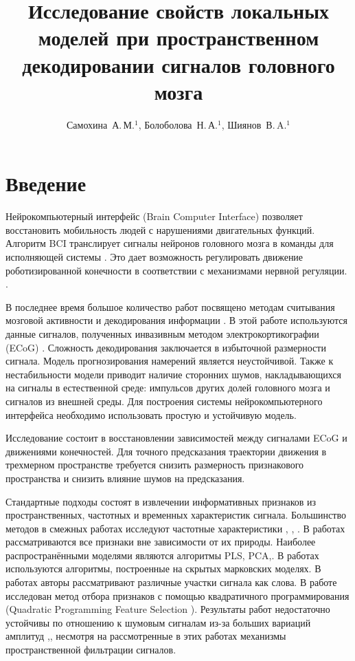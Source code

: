 \documentclass[12pt,twoside]{article}
\title
    [Локальные модели для декодирования сигналов] 
    {Исследование свойств локальных моделей при пространственном декодировании сигналов головного мозга}
\author
    [Самохина~А.\,М.] %
    {Самохина~А.\,М.$^1$, Болоболова~Н.\,А.$^1$, Шиянов~В.\,A.$^1$} %
\begin{document}
\maketitle
\bigskip
\bigskip
\bigskip
\bigskip
\maketitleSecondary

\section{Введение}
Нейрокомпьютерный интерфейс (Brain Computer Interface) \cite{Morishita2014} позволяет восстановить мобильность людей с нарушениями двигательных функций.  Алгоритм BCI транслирует сигналы нейронов головного мозга в команды для исполняющей системы \cite{Morishita2014}. Это дает возможность регулировать движение роботизированной конечности в соответствии с механизмами нервной регуляции. \cite{Donoghue2008}. 


В последнее время большое количество работ посвящено методам считывания мозговой активности и декодирования информации \cite{Hu2018}\cite{Song2017}\cite{Loza2017}\cite{Eliseyev2016}\cite{Gaglianese2016}\cite{Bundy2016}\cite{Morishita2014}.
В этой работе используются данные сигналов, полученных инвазивным методом электрокортикографии (ECoG) \cite{Sirven2014}. Сложность декодирования заключается в избыточной размерности сигнала. Модель прогнозирования намерений является неустойчивой. Также к нестабильности модели приводит наличие сторонних шумов, накладывающихся на сигналы в естественной среде: импульсов других долей головного мозга и сигналов из внешней среды.  Для построения системы нейрокомпьютерного интерфейса необходимо использовать простую и устойчивую модель. 


Исследование состоит в восстановлении зависимостей между сигналами ECoG и движениями конечностей. Для точного предсказания траектории движения в трехмерном пространстве требуется снизить размерность признакового пространства и снизить влияние шумов на предсказания.

Стандартные подходы состоят в извлечении информативных признаков из пространственных, частотных и временных характеристик сигнала\cite{Morishita2014}\cite{Alexander2013}. Большинство методов в смежных работах исследуют частотные характеристики \cite{Chin2007}, \cite{Eliseyev2014}, \cite{Loza2017}. В работах \cite{Eliseyev2016}\cite{Motrenko2018} рассматриваются все признаки вне зависимости от их природы. Наиболее распространёнными моделями являются алгоритмы PLS\cite{Rosipal2006}\cite{Eliseyev2016}, PCA\cite{Zhao2010},\cite{Song2017}. В работах \cite{Zhao2014} используются алгоритмы, построенные на скрытых марковских моделях. В  работах \cite{Loza2017}\cite{Song2017} авторы рассматривают различные участки сигнала как слова. В работе \cite{Motrenko2018} исследован метод отбора признаков с помощью квадратичного программирования (Quadratic Programming Feature Selection \cite{rodriguez2010quadratic}). Результаты работ недостаточно устойчивы по отношению к шумовым сигналам из-за больших вариаций амплитуд \cite{Eliseyev2014},\cite{Song2017}, несмотря на рассмотренные в этих работах механизмы пространственной фильтрации сигналов.
\end{document}
